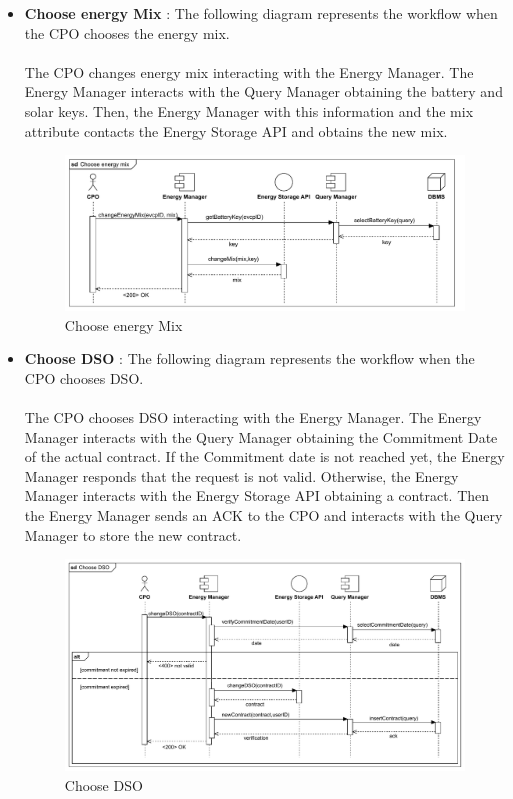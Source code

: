 \begin{itemize}
    \item \textbf{Choose energy Mix} : The following diagram represents the workflow when the CPO chooses the energy mix.\\
          \\ The CPO changes energy mix interacting with the Energy Manager. The Energy Manager interacts with the Query Manager obtaining the battery and solar keys.
          Then, the Energy Manager with this information and the mix attribute contacts the Energy Storage API and obtains the new mix.
          \begin{figure}[H]
              \centering
              \includegraphics[scale=0.65]{src/runtimeView/CPMS_energyMix.pdf}
              \caption{Choose energy Mix}
          \end{figure}
          \pagebreak
    \item \textbf{Choose DSO} : The following diagram represents the workflow when the CPO chooses DSO.\\
          \\ The CPO chooses DSO interacting with the Energy Manager. The Energy Manager interacts with the Query Manager obtaining the Commitment Date of the actual contract.
          If the Commitment date is not reached yet, the Energy Manager responds that the request is not valid.
          Otherwise, the Energy Manager interacts with the Energy Storage API obtaining a contract. Then the Energy Manager sends an ACK to the CPO and interacts with the
          Query Manager to store the new contract.
          \begin{figure}[H]
              \centering
              \includegraphics[scale=0.60]{src/runtimeView/CPMS_chooseDSO.pdf}
              \caption{Choose DSO}
          \end{figure}
\end{itemize}

